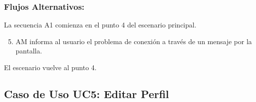 \begin{framed}
\subsubsection{Flujos Alternativos: }

La secuencia A1 comienza en el punto 4 del escenario principal.
\begin{enumerate}
    \setcounter{enumi}{4}
    \item AM informa al usuario el problema de conexión a través de un mensaje por la pantalla.
\end{enumerate}
El escenario vuelve al punto 4.

\end{framed}


\subsection{Caso de Uso UC5: Editar Perfil}

